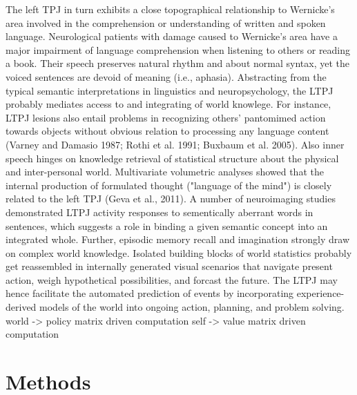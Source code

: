\documentclass{article} %
\begin{document}
The left TPJ in turn exhibits a close topographical relationship to
Wernicke's area
involved in the comprehension or understanding of written and spoken language.
Neurological patients with damage caused to Wernicke's area
have a major impairment of language comprehension
when listening to others or reading a book.
Their speech
preserves natural rhythm and about normal syntax, yet the
voiced sentences are devoid of meaning (i.e., aphasia).
Abstracting from the typical semantic interpretations in linguistics
and neuropsychology,
the LTPJ probably mediates access to and integrating of world knowlege.
For instance, LTPJ lesions also entail problems in recognizing
others' pantomimed action towards objects
without obvious relation to processing any language content
(Varney and Damasio 1987; Rothi et al. 1991; Buxbaum et al. 2005).
%
Also inner speech hinges on knowledge retrieval of statistical structure
about the physical and inter-personal world.
Multivariate volumetric analyses showed that the internal production of
formulated thought ("language of the mind") is closely related to the left TPJ
(Geva et al., 2011).
A number of neuroimaging studies demonstrated LTPJ activity responses
to sementically aberrant words in sentences, which suggests a role
in binding a given semantic concept into an integrated whole.
Further,
episodic memory recall and imagination strongly draw on
complex world knowledge.
Isolated building blocks of world statistics probably get reassembled
in internally generated visual scenarios that
navigate present action, weigh hypothetical possibilities, and forcast the future.
%
The LTPJ may hence facilitate the automated prediction of events
by incorporating experience-derived models of the world
into ongoing action, planning, and problem solving.
world -> policy matrix driven computation
self -> value matrix driven computation


\section{Methods}
\end{document}
